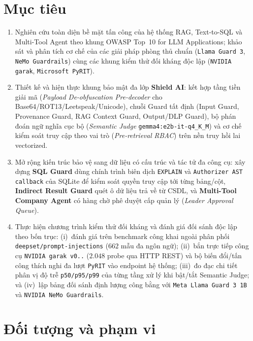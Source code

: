 \section*{Mục tiêu}

\begin{enumerate}
    \item Nghiên cứu toàn diện bề mặt tấn công của hệ thống RAG, Text-to-SQL và Multi-Tool Agent theo khung OWASP Top~10 for LLM Applications; khảo sát và phân tích cơ chế của các giải pháp phòng thủ chuẩn (\texttt{Llama Guard~3}, \texttt{NeMo Guardrails}) cùng các khung kiểm thử đối kháng độc lập (\texttt{NVIDIA garak}, \texttt{Microsoft PyRIT}).
    \item Thiết kế và hiện thực khung bảo mật đa lớp \textbf{Shield AI}: kết hợp tầng tiền giải mã (\emph{Payload De-obfuscation Pre-decoder} cho Base64/ROT13/Leetspeak/Unicode), chuỗi Guard tất định (Input Guard, Provenance Guard, RAG Context Guard, Output/DLP Guard), bộ phán đoán ngữ nghĩa cục bộ (\emph{Semantic Judge} \texttt{gemma4:e2b-\allowbreak it-\allowbreak q4\_\allowbreak K\_\allowbreak M}) và cơ chế kiểm soát truy cập theo vai trò (\emph{Pre-retrieval RBAC}) trên nền truy hồi lai vectorized.
    \item Mở rộng kiến trúc bảo vệ sang dữ liệu có cấu trúc và tác tử đa công cụ: xây dựng \textbf{SQL Guard} dùng chính trình biên dịch \texttt{EXPLAIN} và \texttt{Authorizer AST callback} của SQLite để kiểm soát quyền truy cập tới từng bảng/cột, \textbf{Indirect Result Guard} quét ô dữ liệu trả về từ CSDL, và \textbf{Multi-Tool Company Agent} có hàng chờ phê duyệt cấp quản lý (\emph{Leader Approval Queue}).
    \item Thực hiện chương trình kiểm thử đối kháng và đánh giá đối sánh độc lập theo bốn trục: (i)~đánh giá trên benchmark công khai ngoài phân phối \texttt{deepset/\allowbreak prompt-\allowbreak injections} ($662$ mẫu đa ngôn ngữ); (ii)~bắn trực tiếp công cụ \texttt{NVIDIA garak v0..} ($2.048$ probe qua HTTP REST) và bộ biến đổi/tấn công thích nghi đa lượt \texttt{PyRIT} vào endpoint hệ thống; (iii)~đo đạc chi tiết phân vị độ trễ \texttt{p50/\allowbreak p95/\allowbreak p99} của từng tầng xử lý khi bật/tắt Semantic Judge; và (iv)~lập bảng đối sánh định lượng công bằng với \texttt{Meta Llama Guard~3 1B} và \texttt{NVIDIA NeMo Guardrails}.
\end{enumerate}

\section*{Đối tượng và phạm vi}

